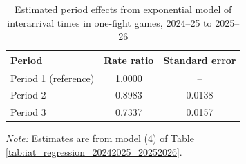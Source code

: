 \begin{table}[!h]
\centering
\caption{Estimated period effects from exponential model of interarrival times in one-fight games, 2024--25 to 2025--26}
\label{tab:period_effects_20242025_20252026}

\begin{tabular}{lcc}
\toprule
Period & Rate ratio & Standard error \\
\midrule
Period 1 (reference) & 1.0000 & -- \\
Period 2 & 0.8983 & 0.0138 \\
Period 3 & 0.7337 & 0.0157 \\
\bottomrule
\end{tabular}

\vspace{0.4em}
\parbox{0.95\textwidth}{
\footnotesize
\textit{Note:} Estimates are from model (4) of Table \ref{tab:iat_regression_20242025_20252026}.
}
\end{table}
